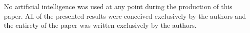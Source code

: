 \documentclass[11pt,letterpaper]{article}
\begin{document}
No artificial intelligence was used at any point during the production of this paper. All of the presented results were conceived exclusively by the authors and the entirety of the paper was written exclusively by the authors.













\end{document}
